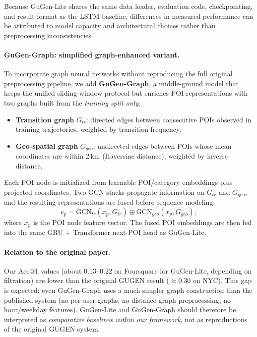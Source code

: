 \documentclass[12pt, journal]{IEEEtran}
\begin{document}
Because GuGen-Lite shares the same data loader, evaluation code, checkpointing, and result format as the LSTM baseline, differences in measured performance can be attributed to model capacity and architectural choices rather than preprocessing inconsistencies.

\paragraph{GuGen-Graph: simplified graph-enhanced variant.}
To incorporate graph neural networks without reproducing the full original preprocessing pipeline, we add \textbf{GuGen-Graph}, a middle-ground model that keeps the unified sliding-window protocol but enriches POI representations with two graphs built from the \emph{training split only}:
\begin{itemize}
    \item \textbf{Transition graph} $G_{tr}$: directed edges between consecutive POIs observed in training trajectories, weighted by transition frequency;
    \item \textbf{Geo-spatial graph} $G_{geo}$: undirected edges between POIs whose mean coordinates are within 2\,km (Haversine distance), weighted by inverse distance.
\end{itemize}
Each POI node is initialized from learnable POI/category embeddings plus projected coordinates. Two GCN stacks propagate information on $G_{tr}$ and $G_{geo}$, and the resulting representations are fused before sequence modeling:
\begin{equation}
    e_p =
    \mathrm{GCN}_{tr}(x_p, G_{tr})
    \oplus
    \mathrm{GCN}_{geo}(x_p, G_{geo}),
\end{equation}
where $x_p$ is the POI node feature vector. The fused POI embeddings are then fed into the same GRU + Transformer next-POI head as GuGen-Lite.

\paragraph{Relation to the original paper.}
Our Acc@1 values (about 0.13--0.22 on Foursquare for GuGen-Lite, depending on filtration) are lower than the original GUGEN result ($\approx 0.30$ on NYC). This gap is expected: even GuGen-Graph uses a much simpler graph construction than the published system (no per-user graphs, no distance-graph preprocessing, no hour/weekday features). GuGen-Lite and GuGen-Graph should therefore be interpreted as \emph{comparative baselines within our framework}, not as reproductions of the original GUGEN system.
\end{document}

